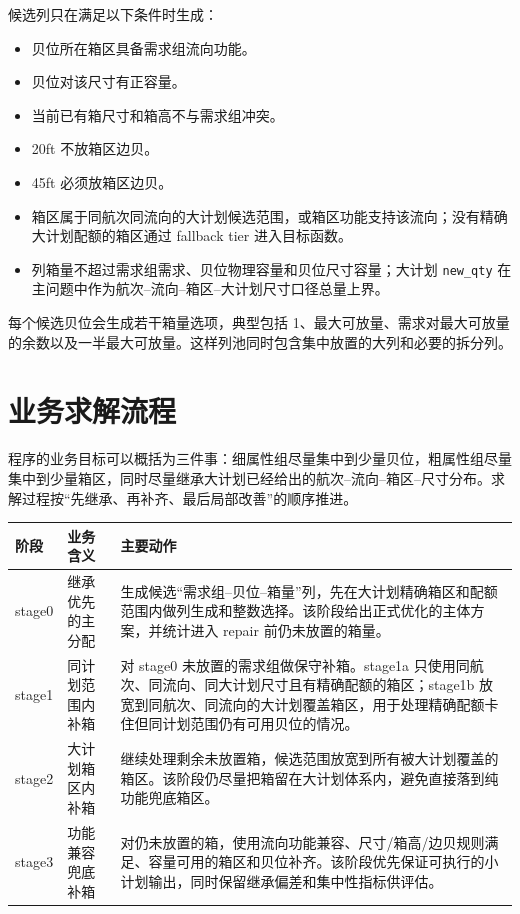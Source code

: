 \documentclass[UTF8,a4paper,11pt]{ctexart}
\newcommand{\code}[1]{\nolinkurl{#1}}
\begin{document}
候选列只在满足以下条件时生成：
\begin{itemize}
  \item 贝位所在箱区具备需求组流向功能。
  \item 贝位对该尺寸有正容量。
  \item 当前已有箱尺寸和箱高不与需求组冲突。
  \item 20ft 不放箱区边贝。
  \item 45ft 必须放箱区边贝。
  \item 箱区属于同航次同流向的大计划候选范围，或箱区功能支持该流向；没有精确大计划配额的箱区通过 fallback tier 进入目标函数。
  \item 列箱量不超过需求组需求、贝位物理容量和贝位尺寸容量；大计划 \code{new\_qty} 在主问题中作为航次--流向--箱区--大计划尺寸口径总量上界。
\end{itemize}

每个候选贝位会生成若干箱量选项，典型包括 1、最大可放量、需求对最大可放量的余数以及一半最大可放量。这样列池同时包含集中放置的大列和必要的拆分列。

\section{业务求解流程}

程序的业务目标可以概括为三件事：细属性组尽量集中到少量贝位，粗属性组尽量集中到少量箱区，同时尽量继承大计划已经给出的航次--流向--箱区--尺寸分布。求解过程按“先继承、再补齐、最后局部改善”的顺序推进。

\begin{longtable}{L{0.12\textwidth}L{0.22\textwidth}L{0.56\textwidth}}
\toprule
阶段 & 业务含义 & 主要动作\\
\midrule
\endhead
stage0 & 继承优先的主分配 & 生成候选“需求组--贝位--箱量”列，先在大计划精确箱区和配额范围内做列生成和整数选择。该阶段给出正式优化的主体方案，并统计进入 repair 前仍未放置的箱量。\\
stage1 & 同计划范围内补箱 & 对 stage0 未放置的需求组做保守补箱。stage1a 只使用同航次、同流向、同大计划尺寸且有精确配额的箱区；stage1b 放宽到同航次、同流向的大计划覆盖箱区，用于处理精确配额卡住但同计划范围仍有可用贝位的情况。\\
stage2 & 大计划箱区内补箱 & 继续处理剩余未放置箱，候选范围放宽到所有被大计划覆盖的箱区。该阶段仍尽量把箱留在大计划体系内，避免直接落到纯功能兜底箱区。\\
stage3 & 功能兼容兜底补箱 & 对仍未放置的箱，使用流向功能兼容、尺寸/箱高/边贝规则满足、容量可用的箱区和贝位补齐。该阶段优先保证可执行的小计划输出，同时保留继承偏差和集中性指标供评估。\\
\bottomrule
\end{longtable}
\end{document}
